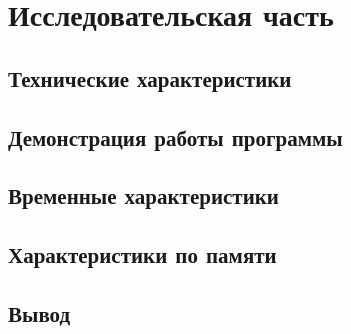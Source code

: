 \section{Исследовательская часть}


\subsection{Технические характеристики}


\subsection{Демонстрация работы программы}


\subsection{Временные характеристики}


\subsection{Характеристики по памяти}


\subsection*{Вывод}

